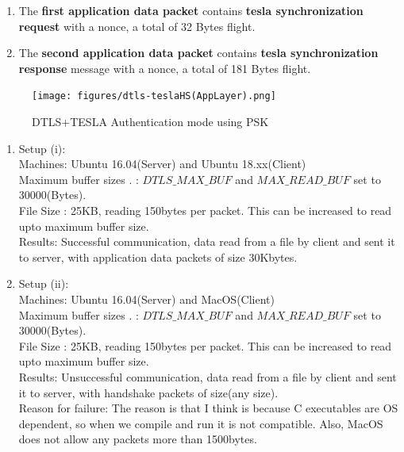 \begin{enumerate}
    \item The \textbf{first application data packet} contains \textbf{tesla synchronization request} with a nonce, a total of 32 Bytes flight.
    
    \item The \textbf{second application data packet} contains \textbf{tesla synchronization response} message with a nonce, a total of 181 Bytes flight.
    
\end{enumerate}  


 \begin{figure}[H]
    \centering
    \texttt{[image: figures/dtls-teslaHS(AppLayer).png]}
    \caption{DTLS+TESLA Authentication mode using PSK}
    \label{hs}
    \end{figure}
    
\begin{enumerate}
    \item Setup (i): \\
    
               Machines: Ubuntu 16.04(Server) and Ubuntu 18.xx(Client) \\
               
               Maximum buffer sizes . :  $DTLS\_MAX\_BUF$ and $MAX\_READ\_BUF$ set to 30000(Bytes).\\
                
                File Size : 25KB, reading 150bytes per packet. This can be increased to read upto maximum buffer size.\\
                
               Results: Successful communication, data read from a file by client and sent it to server, with application data packets of size 30Kbytes. 
    \item Setup (ii): \\
    
               Machines: Ubuntu 16.04(Server) and MacOS(Client) \\
               
               Maximum buffer sizes . :  $DTLS\_MAX\_BUF$ and $MAX\_READ\_BUF$ set to 30000(Bytes).\\
                
                File Size : 25KB, reading 150bytes per packet. This can be increased to read upto maximum buffer size.\\
               
               Results: Unsuccessful communication, data read from a file by client and sent it to server, with handshake packets of size(any size).\\
               
              Reason for failure: The reason is that I think is because C executables are OS dependent, so when we compile and run it is not compatible. Also, MacOS does not allow any packets more than 1500bytes.
\end{enumerate}




